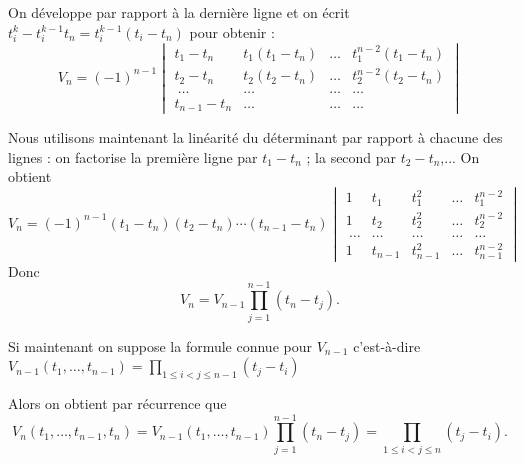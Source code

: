 {{On développe par rapport à la dernière ligne et on écrit $t_i^k-t_i^{k-1}t_n=t_i^{k-1}(t_i-t_n)$ pour obtenir :
$$V_n = (-1)^{n-1}\begin{vmatrix}
 t_1-t_n & t_1(t_1-t_n) & \ldots & t_1^{n-2}(t_1-t_n) \\
 t_2-t_n & t_2(t_2-t_n) & \ldots & t_2^{n-2}(t_2-t_n) \\\
\ldots&\ldots& \ldots & \ldots \\
 t_{n-1}-t_n & \ldots & \ldots & \ldots
\end{vmatrix}$$

Nous utilisons maintenant la linéarité du déterminant par rapport à chacune des lignes :
on factorise la première ligne par $t_1-t_n$ ; la second par $t_2-t_n$,...
On obtient 
$$V_n = (-1)^{n-1}(t_1-t_n)(t_2-t_n)\cdots(t_{n-1}-t_n)
\begin{vmatrix}
1 & t_1 & t_1^2 & \ldots & t_1^{n-2} \\
1 & t_2 & t_2^2 & \ldots & t_2^{n-2} \\\
\ldots&\ldots&\ldots& \ldots & \ldots \\
1 & t_{n-1} & t_{n-1}^2 & \ldots & t_{n-1}^{n-2}
\end{vmatrix} 
$$
Donc $$V_n = V_{n-1}\prod_{j=1}^{n-1}(t_n-t_j).$$

Si maintenant on suppose la formule connue pour $V_{n-1}$
c'est-à-dire $V_{n-1}(t_1,\ldots,t_{n-1})
= \prod_{1 \le i < j \le n-1} (t_j - t_i)$

Alors on obtient par récurrence que
$$V_n(t_1,\ldots,t_{n-1},t_n)= V_{n-1}(t_1,\ldots,t_{n-1})\prod_{j=1}^{n-1}(t_n-t_j) =  \prod_{1 \le i < j \le n} (t_j - t_i).$$
}
}
